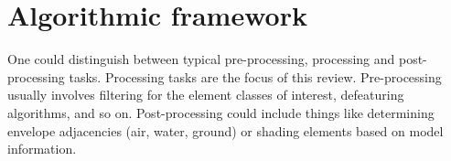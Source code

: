 \documentclass{scrartcl}
\begin{document}
\section{Algorithmic framework}

One could distinguish between typical pre-processing, processing and post-processing tasks. Processing tasks are the focus of this review. Pre-processing usually involves filtering for the element classes of interest, defeaturing algorithms, and so on. Post-processing could include things like determining envelope adjacencies (air, water, ground) or shading elements based on model information.




\end{document}

